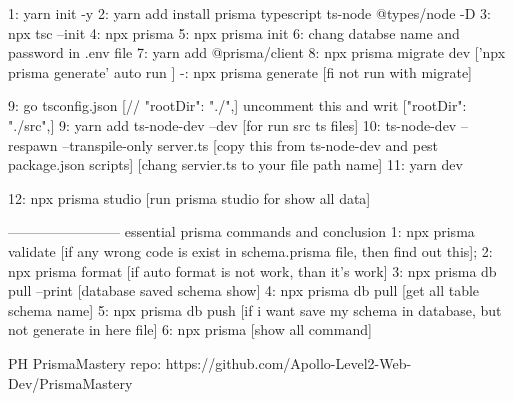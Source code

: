 1: yarn init -y
2: yarn add install prisma typescript ts-node @types/node -D
3: npx tsc --init
4: npx prisma
5: npx prisma init
6: chang databse name and password in .env file 
7: yarn add @prisma/client
8: npx prisma migrate dev ['npx prisma generate' auto run ]
-: npx prisma generate [fi not run with migrate]

9: go tsconfig.json [// "rootDir": "./",] uncomment this and writ ["rootDir": "./src",]
9: yarn add ts-node-dev --dev [for run src ts files]
10: ts-node-dev --respawn --transpile-only server.ts [copy this from ts-node-dev and pest package.json scripts] [chang servier.ts to your file path name]
11: yarn dev

12: npx prisma studio [run prisma studio for show all data]

------------------------
essential prisma commands and conclusion
1: npx prisma validate [if any wrong code is exist in schema.prisma file, then find out this];
2: npx prisma format [if auto format is not work, than it's work]
3: npx prisma db pull --print [database saved schema show]
4: npx prisma db pull [get all table schema name]
5: npx prisma db push [if i want save my schema in database, but not generate in here file]
6: npx prisma [show all command]


PH PrismaMastery repo: https://github.com/Apollo-Level2-Web-Dev/PrismaMastery
